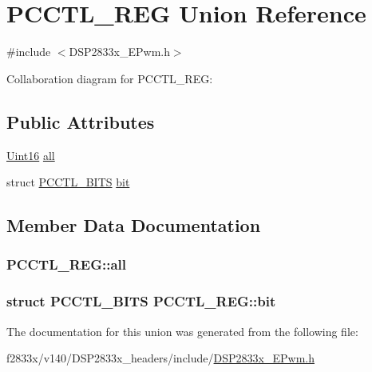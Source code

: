 \hypertarget{union_p_c_c_t_l___r_e_g}{}\section{P\+C\+C\+T\+L\+\_\+\+R\+E\+G Union Reference}
\label{union_p_c_c_t_l___r_e_g}


{\ttfamily \#include $<$D\+S\+P2833x\+\_\+\+E\+Pwm.\+h$>$}



Collaboration diagram for P\+C\+C\+T\+L\+\_\+\+R\+E\+G\+:
\subsection*{Public Attributes}
\begin{DoxyCompactItemize}
\item 
\hyperlink{_d_s_p2833x___device_8h_a59a9f6be4562c327cbfb4f7e8e18f08b}{Uint16} \hyperlink{union_p_c_c_t_l___r_e_g_a49e651573f3b8bfbff1d46d9262f2186}{all}
\item 
struct \hyperlink{struct_p_c_c_t_l___b_i_t_s}{P\+C\+C\+T\+L\+\_\+\+B\+I\+T\+S} \hyperlink{union_p_c_c_t_l___r_e_g_ac8dfca4b64bc9e5f4d8cb8bc621efd33}{bit}
\end{DoxyCompactItemize}


\subsection{Member Data Documentation}
\hypertarget{union_p_c_c_t_l___r_e_g_a49e651573f3b8bfbff1d46d9262f2186}{}
\subsubsection[{all}]{ P\+C\+C\+T\+L\+\_\+\+R\+E\+G\+::all}\label{union_p_c_c_t_l___r_e_g_a49e651573f3b8bfbff1d46d9262f2186}
\hypertarget{union_p_c_c_t_l___r_e_g_ac8dfca4b64bc9e5f4d8cb8bc621efd33}{}
\subsubsection[{bit}]{\setlength{\rightskip}{0pt plus 5cm}struct {\bf P\+C\+C\+T\+L\+\_\+\+B\+I\+T\+S} P\+C\+C\+T\+L\+\_\+\+R\+E\+G\+::bit}\label{union_p_c_c_t_l___r_e_g_ac8dfca4b64bc9e5f4d8cb8bc621efd33}


The documentation for this union was generated from the following file\+:\begin{DoxyCompactItemize}
\item 
f2833x/v140/\+D\+S\+P2833x\+\_\+headers/include/\hyperlink{_d_s_p2833x___e_pwm_8h}{D\+S\+P2833x\+\_\+\+E\+Pwm.\+h}\end{DoxyCompactItemize}
